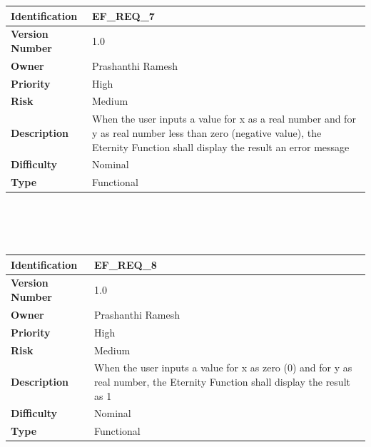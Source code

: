 \documentclass[11pt, english]{report}
\begin{document}
\setlength{\tabcolsep}{18pt}
\renewcommand{\arraystretch}{1.5}
\begin{tabular}{ |p{2.2cm}|p{9.8cm}| }
\hline
\textbf{Identification} &  EF\_REQ\_7 \\ \hline 
\textbf{Version Number} & 1.0 \\ \hline 
\textbf{Owner} & Prashanthi Ramesh  \\ \hline
\textbf{Priority} & High  \\ \hline
\textbf{Risk} & Medium  \\ \hline
\textbf{Description} & When the user inputs a value for x as a real number and for y as real number less than zero (negative value), the Eternity Function shall display the result an error message\\ \hline
\textbf{Difficulty} & Nominal  \\ \hline
\textbf{Type} & Functional \\ 
\hline
\end{tabular} \\ \\ \\ 

\setlength{\tabcolsep}{18pt}
\renewcommand{\arraystretch}{1.5}
\begin{tabular}{ |p{2.2cm}|p{9.8cm}| }
\hline
\textbf{Identification} &  EF\_REQ\_8 \\ \hline 
\textbf{Version Number} & 1.0 \\ \hline 
\textbf{Owner} & Prashanthi Ramesh  \\ \hline
\textbf{Priority} & High  \\ \hline
\textbf{Risk} & Medium  \\ \hline
\textbf{Description} & When the user inputs a value for x as zero (0) and for y as real number, the Eternity Function shall display the result as 1\\ \hline
\textbf{Difficulty} & Nominal  \\ \hline
\textbf{Type} & Functional \\ 
\hline
\end{tabular} \\ \\ \\ 
\end{document}
